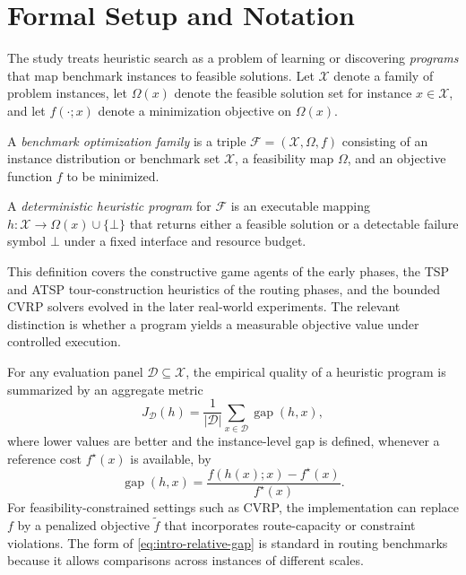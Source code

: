 \section{Formal Setup and Notation}
\label{sec:intro-formal-setup}

The study treats heuristic search as a problem of learning or discovering \emph{programs}
that map benchmark instances to feasible solutions. Let $\mathcal{X}$ denote a family of problem
instances, let $\Omega(x)$ denote the feasible solution set for instance $x \in \mathcal{X}$, and
let $f(\cdot;x)$ denote a minimization objective on $\Omega(x)$.

\begin{definition}
A \emph{benchmark optimization family} is a triple
$\mathcal{F} = (\mathcal{X}, \Omega, f)$ consisting of an instance distribution or benchmark set
$\mathcal{X}$, a feasibility map $\Omega$, and an objective function $f$ to be minimized.
\end{definition}

\begin{definition}
A \emph{deterministic heuristic program} for $\mathcal{F}$ is an executable mapping
$h : \mathcal{X} \to \Omega(x) \cup \{\bot\}$ that returns either a feasible solution or a
detectable failure symbol $\bot$ under a fixed interface and resource budget.
\end{definition}

This definition covers the constructive game agents of the early phases, the TSP and ATSP
tour-construction heuristics of the routing phases, and the bounded CVRP solvers evolved in the
later real-world experiments. The relevant distinction is whether a program yields a measurable
objective value under controlled execution.

For any evaluation panel $\mathcal{D} \subseteq \mathcal{X}$, the empirical quality of a heuristic
program is summarized by an aggregate metric
\begin{equation}
J_{\mathcal{D}}(h) = \frac{1}{|\mathcal{D}|}\sum_{x \in \mathcal{D}} \operatorname{gap}(h,x),
\label{eq:intro-aggregate-gap}
\end{equation}
where lower values are better and the instance-level gap is defined, whenever a reference cost
$f^{\star}(x)$ is available, by
\begin{equation}
\operatorname{gap}(h,x) =
\frac{f(h(x);x)-f^{\star}(x)}{f^{\star}(x)}.
\label{eq:intro-relative-gap}
\end{equation}
For feasibility-constrained settings such as CVRP, the implementation can replace $f$ by a
penalized objective $\tilde{f}$ that incorporates route-capacity or constraint violations. The
form of \eqref{eq:intro-relative-gap} is standard in routing benchmarks because it allows
comparisons across instances of different scales.

